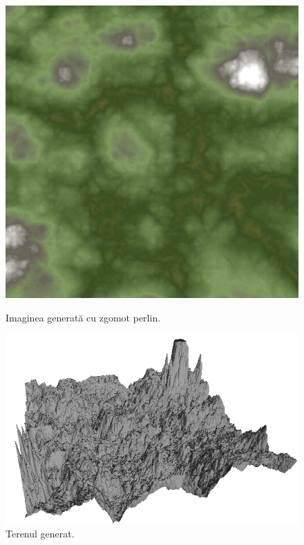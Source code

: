 \documentclass[12pt]{article}
\begin{document}
\begin{figure}[!htb]
	\begin{minipage}{0.24\textwidth}
		\centering
		\includegraphics[width=0.95\linewidth]{Teren/TerenImg.png}
		\caption{Imaginea generată cu zgomot perlin.}\label{fig:fig4}
	\end{minipage}\hfill
	\begin{minipage}{0.24\textwidth}
		\centering
		\includegraphics[width=.95\linewidth]{Teren/TerenMesh.png}
		\caption{Terenul generat.}\label{fig:fig5}
	\end{minipage}\hfill
        \begin{minipage}{0.24\textwidth}

\end{minipage}
\end{figure}
\end{document}
